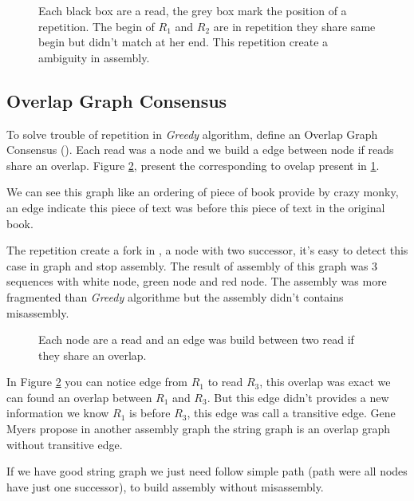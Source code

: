 \documentclass[./main.tex]{subfiles}
\begin{document}
\begin{figure}[ht]
    \centering 
    
    \caption{Each black box are a read, the grey box mark the position of a repetition. The begin of $R_1$ and $R_2$ are in repetition they share same begin but didn't match at her end. This repetition create a ambiguity in assembly.}
    \label{intro:fig:greedy:repetition}
\end{figure}

\subsection{Overlap Graph Consensus}

To solve trouble of repetition in \textit{Greedy} algorithm,  define an Overlap Graph Consensus (\OLC). Each read was a node and we build a edge between node if reads share an overlap. Figure \ref{intro:fig:olc:graph}, present the \OLC corresponding to ovelap present in \ref{intro:fig:greedy:repetition}.

We can see this graph like an ordering of piece of book provide by crazy monky, an edge indicate this piece of text was before this piece of text in the original book.

The repetition create a fork in \OLC, a node with two successor, it's easy to detect this case in graph and stop assembly. The result of assembly of this graph was 3 sequences with white node, green node and red node. The assembly was more fragmented than \textit{Greedy} algorithme but the assembly didn't contains misassembly.

\begin{figure}[ht]
    \centering 
    
    \caption{Each node are a read and an edge was build between two read if they share an overlap.}
    \label{intro:fig:olc:graph}
\end{figure}

In Figure \ref{intro:fig:olc:graph} you can notice edge from $R_1$ to read $R_3$, this overlap was exact we can found an overlap between $R_1$ and $R_3$. But this edge didn't provides a new information we know $R_1$ is before $R_3$, this edge was call a transitive edge. Gene Myers propose in \cite{string_graph} another assembly graph the string graph is an overlap graph without transitive edge.

If we have good string graph we just need follow simple path (path were all nodes have just one successor), to build assembly without misassembly.
\end{document}
